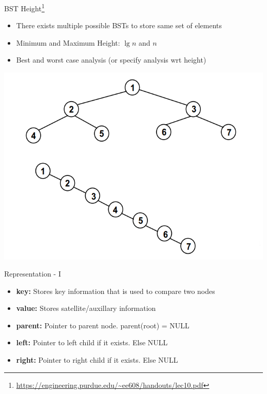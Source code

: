 \documentclass{beamer}
\begin{document}
\begin{frame}{BST Height\footnote{\url{https://engineering.purdue.edu/~ee608/handouts/lec10.pdf}}}
    \begin{itemize}
        \item There exists multiple possible BSTs to store same set of elements
        \item Minimum and Maximum Height: \pause $\lg n$ and $n$
        \item Best and worst case analysis (or specify analysis wrt height)
    \end{itemize}
    \begin{center}
        \includegraphics[scale=0.28]{bstMinMaxExamples.png}
    \end{center}
\end{frame}


\begin{frame}{Representation - I} 
    \begin{itemize}
        \item {\bf key:} Stores key information that is used to compare two nodes
        \item {\bf value:} Stores satellite/auxillary information
        \item {\bf parent:} Pointer to parent node. parent(root) = NULL
        \item {\bf left:} Pointer to left child if it exists. Else NULL
        \item {\bf right:} Pointer to right child if it exists. Else NULL
    \end{itemize}
\end{frame}
\end{document}
